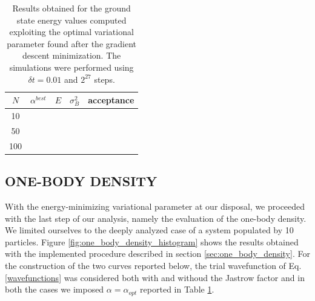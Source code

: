 \begin{table}[H]
    \centering
    \begin{tabular}{ccccc}
            $N$ & $\alpha^{best}$ & $E$ & $\sigma^2_B$ & acceptance \\
            \midrule
            10 & & & &  \\
            50 &  & & &  \\
            100 &  &  &  &  \\
            \midrule
        \end{tabular}
    \caption{Results obtained for the ground state energy values computed exploiting the optimal variational parameter found after the gradient descent minimization. The simulations were performed using $\delta t = 0.01$ and $2^{27}$ steps.}
    \label{tab:final_GS_energy}
\end{table}




\subsection{ONE-BODY DENSITY}
With the energy-minimizing variational parameter at our disposal, we proceeded with the last step of our analysis, namely the evaluation of the one-body density. We limited ourselves to the deeply analyzed case of a system populated by 10 particles. Figure \ref{fig:one_body_density_histogram} shows the results obtained with the implemented procedure described in section \ref{sec:one_body_density}. For the construction of the two curves reported below, the trial wavefunction of Eq.\,\ref{wavefunctions} was considered both with and withoud the Jastrow factor and in both the cases we imposed $\alpha=\alpha_{opt}$ reported in Table \ref{tab:final_GS_energy}.



